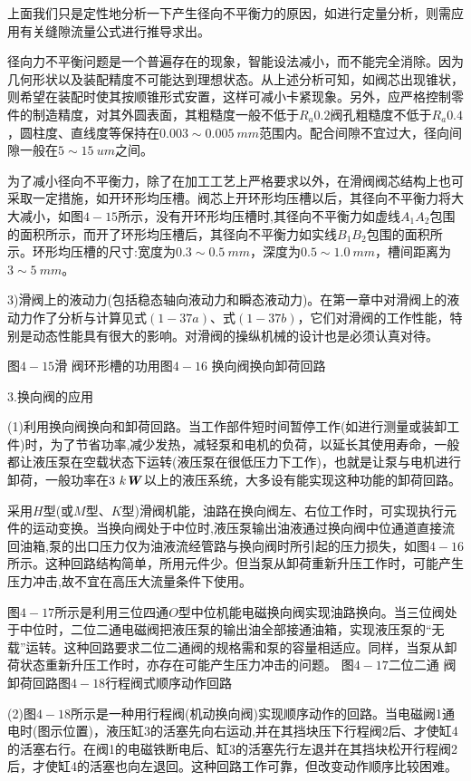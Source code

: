 
上面我们只是定性地分析一下产生径向不平衡力的原因，如进行定量分析，则需应用有关缝隙流量公式进行推导求出。

径向力不平衡问题是一个普遍存在的现象，智能设法减小，而不能完全消除。因为几何形状以及装配精度不可能达到理想状态。从上述分析可知，如阀芯出现锥状，则希望在装配时使其按顺锥形式安置，这样可减小卡紧现象。另外，应严格控制零件的制造精度，对其外圆表面，其粗糙度一般不低于$R_a0.2$阀孔粗糙度不低于$R_a0.4$，圆柱度、直线度等保持在$0.003\sim0.005 \ mm$范围内。配合间隙不宜过大，径向间隙一般在$5\sim15 \ u m$之间。

为了减小径向不平衡力，除了在加工工艺上严格要求以外，在滑阀阀芯结构上也可采取一定措施，如开环形均压槽。阀芯上开环形均压槽以后，其径向不平衡力将大大减小，如图$4-15$所示，没有开环形均压槽时,其径向不平衡力如虚线$A_1A_2$包围的面积所示，而开了环形均压槽后，其径向不平衡力如实线$B_1B_2$包围的面积所示。环形均压槽的尺寸:宽度为$0.3 \sim0.5 \ mm$，深度为$0.5\sim 1. 0\ mm$，槽间距离为$3\sim 5\ mm$。

3)滑阀上的液动力(包括稳态轴向液动力和瞬态液动力)。在第一章中对滑阀上的液动力作了分析与计算见式$(1-37a)$、式$(1-37b)$，它们对滑阀的工作性能，特别是动态性能具有很大的影响。对滑阀的操纵机械的设计也是必须认真对待。

图$4-15$滑 阀环形槽的功用图$4-16$ 换向阀换向卸荷回路

3.换向阀的应用

(1)利用换向阀换向和卸荷回路。当工作部件短时间暂停工作(如进行测量或装卸工件)时，为了节省功率,减少发热，减轻泵和电机的负荷，以延长其使用寿命，一般都让液压泵在空载状态下运转(液压泵在很低压力下工作)，也就是让泵与电机进行卸荷，一般功率在$3\ k\textbf{\emph{W}}$以上的液压系统，大多设有能实现这种功能的卸荷回路。

采用$H$型(或$M$型、$K$型)滑阀机能，油路在换向阀左、右位工作时，可实现执行元件的运动变换。当换向阀处于中位时,液压泵输出油液通过换向阀中位通道直接流回油箱,泵的出口压力仅为油液流经管路与换向阀时所引起的压力损失，如图$4-16$所示。这种回路结构简单，所用元件少。但当泵从卸荷重新升压工作时，可能产生压力冲击,故不宜在高压大流量条件下使用。

图$4-17$所示是利用三位四通$O$型中位机能电磁换向阀实现油路换向。当三位阀处于中位时，二位二通电磁阀把液压泵的输出油全部接通油箱，实现液压泵的“无载”运转。这种回路要求二位二通阀的规格需和泵的容量相适应。同样，当泵从卸荷状态重新升压工作时，亦存在可能产生压力冲击的问题。
图$4-17$二位二通 阀卸荷回路图$4-18$行程阀式顺序动作回路

(2)图$4-18$所示是一种用行程阀(机动换向阀)实现顺序动作的回路。当电磁阙1通电时(图示位置)，液压缸3的活塞先向右运动,并在其挡块压下行程阀2后、才使缸4的活塞右行。在阀1的电磁铁断电后、缸3的活塞先行左退并在其挡块松开行程阀2后，才使缸4的活塞也向左退回。这种回路工作可靠，但改变动作顺序比较困难。

